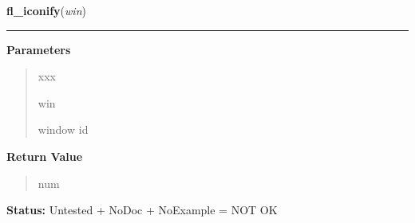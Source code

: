     \label{xformslib:library:fl_iconify}

    \vspace{0.5ex}

\hspace{.8\funcindent}\begin{boxedminipage}{\funcwidth}

    \raggedright \textbf{fl\_iconify}(\textit{win})

    \vspace{-1.5ex}

    \rule{\textwidth}{0.5\fboxrule}
\setlength{\parskip}{2ex}
\setlength{\parskip}{1ex}
      \textbf{Parameters}
      \vspace{-1ex}

      \begin{quote}
        \begin{Ventry}{xxx}

          \item[win]

          window id

        \end{Ventry}

      \end{quote}

      \textbf{Return Value}
    \vspace{-1ex}

      \begin{quote}
      num

      \end{quote}

\textbf{Status:} Untested + NoDoc + NoExample = NOT OK



    \end{boxedminipage}

    \label{xformslib:library:fl_winresize}

    \vspace{0.5ex}

